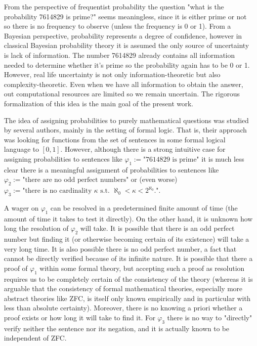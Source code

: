 \documentclass{article}
\numberwithin{equation}{section}
\theoremstyle{definition}
\theoremstyle{plain}
\begin{document}
From the perspective of frequentist probability the question "what is the probability 7614829 is prime?" seems meaningless, since it is either prime or not so there is no frequency to observe (unless the frequency is 0 or 1). From a Bayesian perspective, probability represents a degree of confidence, however in classical Bayesian probability theory it is assumed the only source of uncertainty is lack of information. The number 7614829 already contains all information needed to determine whether it's prime so the probability again has to be 0 or 1. However, real life uncertainty is not only information-theoretic but also complexity-theoretic. Even when we have all information to obtain the answer, out computational resources are limited so we remain uncertain. The rigorous formalization of this idea is the main goal of the present work.

The idea of assigning probabilities to purely mathematical questions was studied by several authors\cite{Gaifman_2004,Hutter_2013,Demski_2012,Christiano_2014,Garrabrant_2015}, mainly in the setting of formal logic. That is, their approach was looking for functions from the set of sentences in some formal logical language to $[0,1]$. However, although there is a strong intuitive case for assigning probabilities to sentences like $\varphi_1:=\text{"7614829 is prime"}$ it is much less clear there is a meaningful assignment of probabilities to sentences like $\varphi_2 := \text{"there are no odd perfect numbers"}$ or (even worse) $\varphi_3 := \text{"there is no cardinality } \kappa \text{ s.t. } \aleph_0 < \kappa < 2^{\aleph_0} \text{."}$.

A wager on $\varphi_1$ can be resolved in a predetermined finite amount of time (the amount of time it takes to test it directly). On the other hand, it is unknown how long the resolution of $\varphi_2$ will take. It is possible that there is an odd perfect number but finding it (or otherwise becoming certain of its existence) will take a very long time. It is also possible there is no odd perfect number, a fact that cannot be directly verified because of its infinite nature. It is possible that there a proof of $\varphi_1$ within some formal theory, but accepting such a proof as resolution requires us to be completely certain of the consistency of the theory (whereas it is arguable that the consistency of formal mathematical theories, especially more abstract theories like ZFC, is itself only known empirically and in particular with less than absolute certainty). Moreover, there is no knowing a priori whether a proof exists or how long it will take to find it. For $\varphi_3$ there is no way to "directly" verify neither the sentence nor its negation, and it is actually known to be independent of ZFC.
\end{document}
